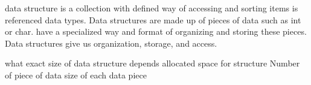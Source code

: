 data structure 
  is a collection with defined way of accessing and sorting items
  is referenced data types.
  Data structures are made up of pieces of data such as int or char.
  have a specialized way and format of organizing and storing these pieces.
  Data structures give us organization, storage, and access.

what exact size of data structure depends 
  allocated space for structure
  Number of piece of data 
  size of each data piece
